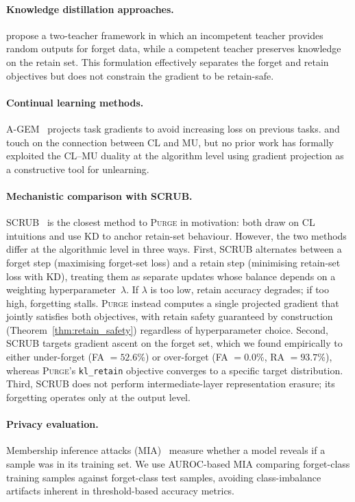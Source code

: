 \documentclass{article}
\newcommand{\ours}{\textsc{Purge}}
\newcommand{\klr}{\texttt{kl\_retain}}
\begin{document}
\paragraph{Knowledge distillation approaches.}
\citet{chundawat2023badteacher} propose a two-teacher framework in which an incompetent teacher provides random outputs for forget data, while a competent teacher preserves knowledge on the retain set.
This formulation effectively separates the forget and retain objectives but does not constrain the gradient to be retain-safe.

\paragraph{Continual learning methods.}
A-GEM~\cite{chaudhry2019agem} projects task gradients to avoid increasing loss on previous tasks.
\citet{nguyen2020variational} and \citet{kurmanji2023unbounded} touch on the connection between CL and MU, but no prior work has formally exploited the CL--MU duality at the algorithm level using gradient projection as a constructive tool for unlearning.

\paragraph{Mechanistic comparison with SCRUB.}
SCRUB~\cite{kurmanji2023unbounded} is the closest method to \ours{} in motivation: both draw on CL intuitions and use KD to anchor retain-set behaviour.
However, the two methods differ at the algorithmic level in three ways.
First, SCRUB alternates between a forget step (maximising forget-set loss) and a retain step (minimising retain-set loss with KD), treating them as separate updates whose balance depends on a weighting hyperparameter~$\lambda$.
If $\lambda$ is too low, retain accuracy degrades; if too high, forgetting stalls.
\ours{} instead computes a single projected gradient that jointly satisfies both objectives, with retain safety guaranteed by construction (Theorem~\ref{thm:retain_safety}) regardless of hyperparameter choice.
Second, SCRUB targets gradient ascent on the forget set, which we found empirically to either under-forget (FA $= 52.6$\%) or over-forget (FA $= 0.0$\%, RA $= 93.7$\%), whereas \ours{}'s \klr{} objective converges to a specific target distribution.
Third, SCRUB does not perform intermediate-layer representation erasure; its forgetting operates only at the output level.

\paragraph{Privacy evaluation.}
Membership inference attacks (MIA)~\cite{shokri2017mia,carlini2022mia} measure whether a model reveals if a sample was in its training set.
We use AUROC-based MIA comparing forget-class training samples against forget-class test samples, avoiding class-imbalance artifacts inherent in threshold-based accuracy metrics.
\end{document}
